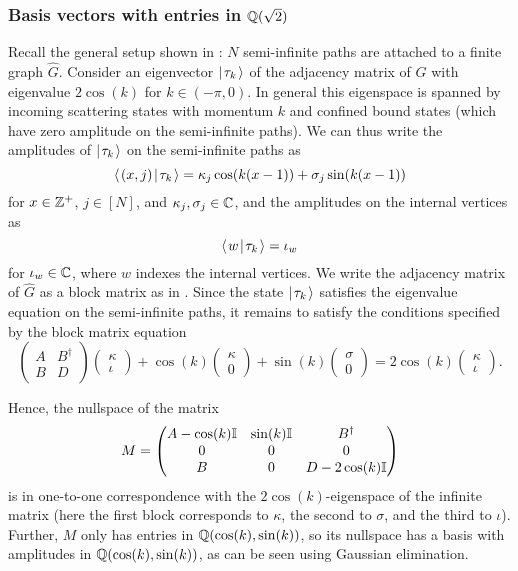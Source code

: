 \documentclass[../thesis-main/thesis-main]{subfiles}
\begin{document}
\subsubsection{Basis vectors with entries in $\mathbb{Q}(\sqrt{2})$}
\label{sec:vecs_over_field}

Recall the general setup shown in : $N$ semi-infinite paths are attached to a finite graph $\hat G$. Consider an eigenvector $|\mspace{2mu} \tau_k \mspace{2mu} \rangle$ of the adjacency matrix of $G$ with eigenvalue $2\cos(k)$ for $k\in (-\pi,0)$. In general this eigenspace is spanned by incoming scattering states with momentum $k$ and confined bound states \cite{CG12} (which have zero amplitude on the semi-infinite paths). We can thus write the amplitudes of $|\mspace{2mu} \tau_k \mspace{2mu} \rangle$ on the semi-infinite paths as
\[
  \langle\mspace{2mu} (x,j) \mspace{2mu} | \mspace{2mu} \tau_k\mspace{2mu} \rangle 
  = \kappa_j \cos(k (x-1)) + \sigma_j \sin(k (x-1))
\]
for $x \in \mathbb{Z}^+$, $j \in [N]$, and $\kappa_j,\sigma_j \in \mathbb{C}$, and the amplitudes on the internal vertices as
\[
  \langle\mspace{2mu} w \mspace{2mu} | \mspace{2mu} \tau_k\mspace{2mu} \rangle = \iota_w
\]
for $\iota_w \in \mathbb{C}$, where $w$ indexes the internal vertices. We write the adjacency matrix of $\hat{G}$ as a block matrix as in .  Since the state $|\mspace{2mu} \tau_k \mspace{2mu} \rangle$ satisfies the eigenvalue equation on the semi-infinite paths, it remains to satisfy the conditions specified by the block matrix equation
\begin{equation*}
  \begin{pmatrix} A & B^\dag\\ B & D\end{pmatrix}
	\begin{pmatrix} \kappa \\ \iota \end{pmatrix}
	+ \cos(k) \begin{pmatrix} \kappa \\ 0 \end{pmatrix}
	+ \sin(k) \begin{pmatrix} \sigma \\ 0 \end{pmatrix} 
	= 2\cos(k) \begin{pmatrix} \kappa \\ \iota \end{pmatrix}.
\end{equation*}

Hence, the nullspace of the matrix
\[
  M= \begin{pmatrix} A -\cos(k) \mathbb{I} & \sin(k) \mathbb{I} & B^\dag\\
    0 & 0 & 0\\
    B & 0 & D-2\cos(k)\mathbb{I}\end{pmatrix}
\]
is in one-to-one correspondence with the $2\cos(k)$-eigenspace of the infinite matrix (here the first block corresponds to $\kappa$, the second to $\sigma$, and the third to $\iota$). Further, $M$ only has entries in $\mathbb{Q}(\cos(k),\sin(k))$, so its nullspace has a basis with amplitudes in $\mathbb{Q}(\cos(k),\sin(k))$, as can be seen using Gaussian elimination.
\end{document}
